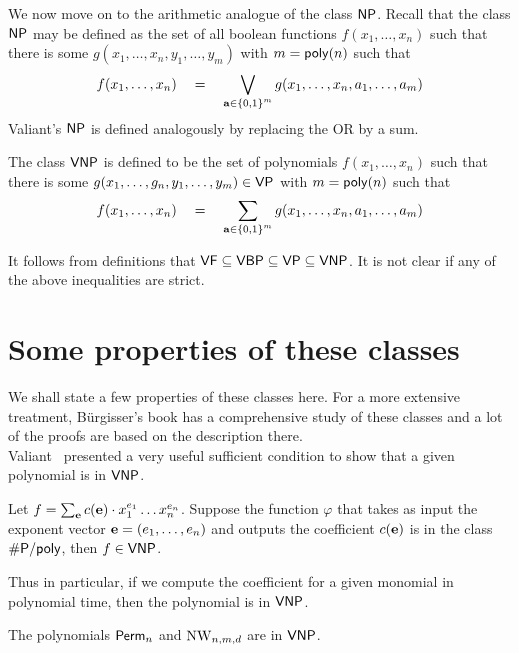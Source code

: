 We now move on to the arithmetic analogue of the class $\NP$. Recall that the class $\NP$ may be defined as the set of all boolean functions $f(x_1,\dots, x_n)$ such that there is some $g(x_1,\dots, x_n, y_1,\dots, y_m)$ with $m = \mathsf{poly}(n)$ such that 
\[
f(x_1,\dots, x_n)\quad = \quad \bigvee_{\mathbf{a} \in \left\{0,1\right\}^m}  g(x_1,\dots, x_n, a_1,\dots, a_m)
\]
Valiant's $\NP$ is defined analogously by replacing the OR by a sum. 

\begin{definition}[Valiant's $\NP$]\label{defn:vnp}
The class $\mathsf{VNP}$ is defined to be the set of polynomials $f(x_1,\dots, x_n)$ such that there is some $g(x_1,\dots, g_n, y_1,\dots, y_m) \in \mathsf{VP}$ with $m = \mathsf{poly}(n)$ such that 
\[
f(x_1,\dots, x_n)\quad = \quad \sum_{\mathbf{a} \in \left\{0,1\right\}^m}  g(x_1,\dots, x_n, a_1,\dots, a_m)
\]
\end{definition}

It follows from definitions that $\mathsf{VF} \subseteq \mathsf{VBP} \subseteq \mathsf{VP} \subseteq \mathsf{VNP}$. It is not clear if any of the above inequalities are strict. 

\section{Some properties of these classes}

We shall state a few properties of these classes here. For a more extensive treatment, B\"{u}rgisser's book \cite{bur00} has a comprehensive study of these classes and a lot of the proofs are based on the description there. \\

Valiant~\cite{v79} presented a very useful sufficient condition to show that a given polynomial is in $\mathsf{VNP}$. 

\begin{theorem} \label{thm:val-criterion}
Let $f = \sum_{\mathbf{e}} c(\mathbf{e}) \cdot x_1^{e_1}\dots x_n^{e_n}$. Suppose the function $\varphi$ that takes as input the exponent vector $\mathbf{e} = (e_1,\dots, e_n)$ and outputs the coefficient $c(\mathbf{e})$ is in the class $\#\mathsf{P}/\mathsf{poly}$, then $f \in \mathsf{VNP}$. 
\end{theorem}

Thus in particular, if we compute the coefficient for a given monomial in polynomial time, then the polynomial is in $\mathsf{VNP}$. 

\begin{corollary}
The polynomials $\mathsf{Perm}_n$ and $\mathrm{NW}_{n,m,d}$ are in $\mathsf{VNP}$. 
\end{corollary}

